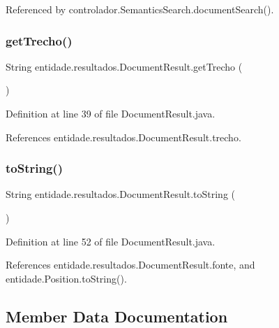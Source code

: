 Referenced by controlador.\+Semantics\+Search.\+document\+Search().

\hypertarget{classentidade_1_1resultados_1_1DocumentResult_a365863d1ef9df91c89700c01107e4c11}{}\label{classentidade_1_1resultados_1_1DocumentResult_a365863d1ef9df91c89700c01107e4c11} 
\subsubsection{\texorpdfstring{get\+Trecho()}{getTrecho()}}
{\footnotesize\ttfamily String entidade.\+resultados.\+Document\+Result.\+get\+Trecho (\begin{DoxyParamCaption}{ }\end{DoxyParamCaption})}



Definition at line 39 of file Document\+Result.\+java.



References entidade.\+resultados.\+Document\+Result.\+trecho.

\hypertarget{classentidade_1_1resultados_1_1DocumentResult_a8cd843267b63c52a03ed3326833df1a0}{}\label{classentidade_1_1resultados_1_1DocumentResult_a8cd843267b63c52a03ed3326833df1a0} 
\subsubsection{\texorpdfstring{to\+String()}{toString()}}
{\footnotesize\ttfamily String entidade.\+resultados.\+Document\+Result.\+to\+String (\begin{DoxyParamCaption}{ }\end{DoxyParamCaption})}



Definition at line 52 of file Document\+Result.\+java.



References entidade.\+resultados.\+Document\+Result.\+fonte, and entidade.\+Position.\+to\+String().



\subsection{Member Data Documentation}
\hypertarget{classentidade_1_1resultados_1_1DocumentResult_a3b075228042908bf76793f2bf7f8bdf3}{}\label{classentidade_1_1resultados_1_1DocumentResult_a3b075228042908bf76793f2bf7f8bdf3} 
